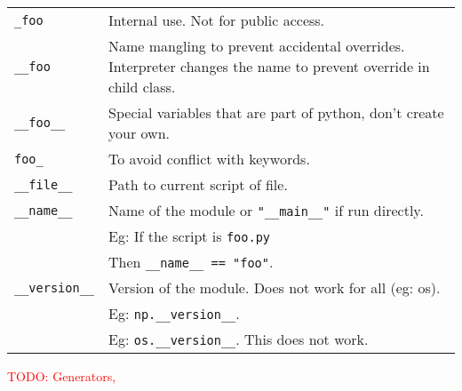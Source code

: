 \begin{tabularx}{\linewidth}{lX}
\texttt{\_foo}                  & Internal use. Not for public access.\\
\texttt{\_\_foo}                & Name mangling to prevent accidental overrides. Interpreter changes
                                    the name to prevent override in child class.\\
\texttt{\_\_foo\_\_}            & Special variables that are part of python, don't create your own.\\
\texttt{foo\_}                  & To avoid conflict with keywords.\\
\hline
\texttt{\_\_file\_\_}           & Path to current script of file.\\
\texttt{\_\_name\_\_}           & Name of the module or \texttt{"\_\_main\_\_"} if run directly.\\
                                & Eg: If the script is \texttt{foo.py}\\
                                & Then \texttt{\_\_name\_\_ == "foo"}.\\
\texttt{\_\_version\_\_}        & Version of the module. Does not work for all (eg: os).\\
                                & Eg: \texttt{np.\_\_version\_\_}.\\
                                & Eg: \texttt{os.\_\_version\_\_}. This does not work.\\
\hline
\end{tabularx}



\textcolor{red}{TODO: Generators, }

\pagebreak